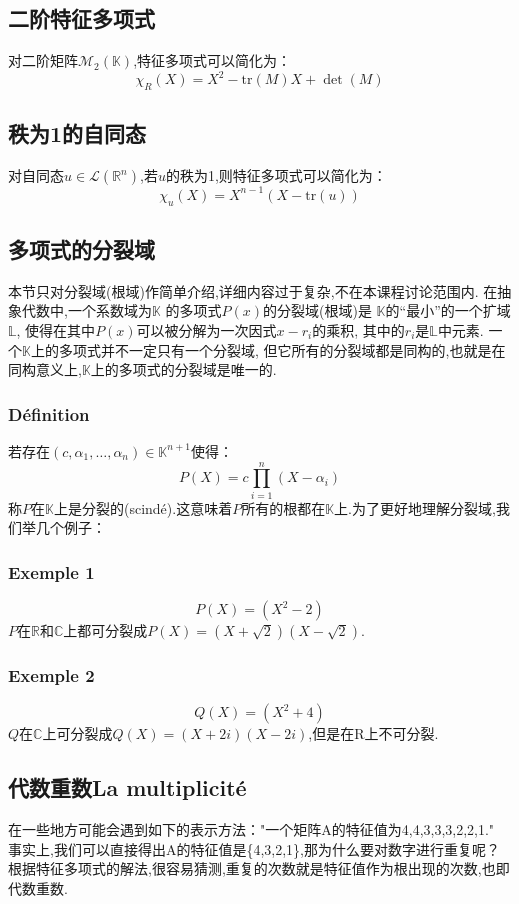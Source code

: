 \documentclass[12pt, a4paper, oneside]{ctexbook}
\newcommand{\R }{\mathbb{R}}%
\begin{document}
  \subsection{二阶特征多项式}
  对二阶矩阵$\mathcal{M}_2(\mathbb{K})$,特征多项式可以简化为：
  $$
  \chi _R(X)=X^2-\mbox{tr}(M)X+\det(M)
  $$
  \subsection{秩为1的自同态}
  对自同态$u\in\mathcal{L} (\R^n)$,若$u$的秩为1,则特征多项式可以简化为：
  $$
  \chi _u(X)=X^{n-1}(X-\mbox{tr}(u))
  $$
  \subsection{多项式的分裂域}
  本节只对分裂域(根域)作简单介绍,详细内容过于复杂,不在本课程讨论范围内.
  在抽象代数中,一个系数域为$\mathbb {K}$ 的多项式${P(x)}$的分裂域(根域)是
  $\mathbb {K} $的“最小”的一个扩域$\mathbb{L}$,
  使得在其中$P(x)$可以被分解为一次因式$x-r_{i}$的乘积,
  其中的$r_{i}$是$\mathbb{L}$中元素.
  一个$\mathbb {K} $上的多项式并不一定只有一个分裂域,
  但它所有的分裂域都是同构的,也就是在同构意义上,$\mathbb {K} $上的多项式的分裂域是唯一的.
  \subsubsection{Définition}
  若存在$(c,\alpha_1,\dots,\alpha_n)\in\mathbb{K}^{n+1}$使得：
  $$
    P(X)=c\prod_{i=1}^{n} (X-\alpha_i)
  $$
  称$P$在$\mathbb {K} $上是分裂的(scindé).这意味着$P$所有的根都在$\mathbb {K} $上.为了更好地理解分裂域,我们举几个例子：
  \subsubsection{Exemple 1}
  $$
    P(X)=(X^2-2)
  $$
  $P$在$\mathbb {R} $和$\mathbb {C} $上都可分裂成$P(X)=(X+\sqrt{2})(X-\sqrt{2})$.
  \subsubsection{Exemple 2}
  $$
    Q(X)=(X^2+4)
  $$
  $Q$在$\mathbb {C} $上可分裂成$Q(X)=(X+2i)(X-2i)$,但是在R上不可分裂.
  \subsection{代数重数La multiplicité}
  在一些地方可能会遇到如下的表示方法："一个矩阵A的特征值为4,4,3,3,3,2,2,1."
  事实上,我们可以直接得出A的特征值是\{4,3,2,1\},那为什么要对数字进行重复呢？
  根据特征多项式的解法,很容易猜测,重复的次数就是特征值作为根出现的次数,也即代数重数.
\end{document}
